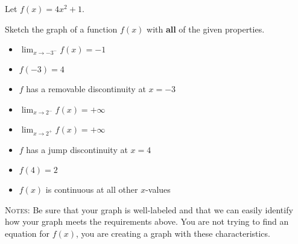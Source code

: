 \documentclass[addpoints,12pt]{exam}
\newcommand{\ds}{\displaystyle}
\begin{document}
\begin{questions}
\newpage




\question Let $f(x) = 4x^2+1$.





\newpage



\question[10] Sketch the graph of a function $f(x)$ with \textbf{all} of the given properties.

\begin{itemize}
\item $\displaystyle{\lim_{x\to -3^{-}} f(x) = -1}$
\item $f(-3)=4$
\item $f$ has a removable discontinuity at $x=-3$
\item $\displaystyle{\lim_{x\to 2^{-}} f(x) = +\infty}$
\item $\displaystyle{\lim_{x\to 2^{+}} f(x) = +\infty}$
\item $f$ has a jump discontinuity at $x= 4$
\item $f(4)=2$
\item $f(x)$ is continuous at all other $x$-values
\end{itemize}




\noindent\textsc{Notes:} Be sure that your graph is well-labeled and that we can easily identify
how your graph meets the requirements above. You are not trying to find an equation for $f(x)$,
you are creating a graph with these characteristics.


\end{questions}
\end{document}
